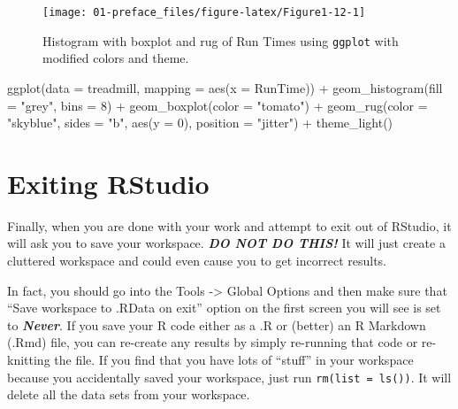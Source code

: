 \documentclass[
]{book}
\newenvironment{Shaded}{\begin{snugshade}}{\end{snugshade}}
\newcommand{\AttributeTok}[1]{\textcolor[rgb]{0.77,0.63,0.00}{#1}}
\newcommand{\DecValTok}[1]{\textcolor[rgb]{0.00,0.00,0.81}{#1}}
\newcommand{\FunctionTok}[1]{\textcolor[rgb]{0.00,0.00,0.00}{#1}}
\newcommand{\NormalTok}[1]{#1}
\newcommand{\SpecialCharTok}[1]{\textcolor[rgb]{0.00,0.00,0.00}{#1}}
\newcommand{\StringTok}[1]{\textcolor[rgb]{0.31,0.60,0.02}{#1}}
\begin{document}
\begin{figure}[ht!]

{\centering \texttt{[image: 01-preface\_files/figure-latex/Figure1-12-1]} 

}

\caption{Histogram with boxplot and rug of Run Times using \texttt{ggplot} with modified colors and theme.}\label{fig:Figure1-12}
\end{figure}

\begin{Shaded}
\begin{Highlighting}[]
\FunctionTok{ggplot}\NormalTok{(}\AttributeTok{data =}\NormalTok{ treadmill, }\AttributeTok{mapping =} \FunctionTok{aes}\NormalTok{(}\AttributeTok{x =}\NormalTok{ RunTime)) }\SpecialCharTok{+} 
  \FunctionTok{geom\_histogram}\NormalTok{(}\AttributeTok{fill =} \StringTok{"grey"}\NormalTok{, }\AttributeTok{bins =} \DecValTok{8}\NormalTok{) }\SpecialCharTok{+} 
  \FunctionTok{geom\_boxplot}\NormalTok{(}\AttributeTok{color =} \StringTok{"tomato"}\NormalTok{) }\SpecialCharTok{+} 
    \FunctionTok{geom\_rug}\NormalTok{(}\AttributeTok{color =} \StringTok{"skyblue"}\NormalTok{, }\AttributeTok{sides =} \StringTok{"b"}\NormalTok{, }\FunctionTok{aes}\NormalTok{(}\AttributeTok{y =} \DecValTok{0}\NormalTok{), }\AttributeTok{position =} \StringTok{"jitter"}\NormalTok{) }\SpecialCharTok{+} 
  \FunctionTok{theme\_light}\NormalTok{()}
\end{Highlighting}
\end{Shaded}

\newpage

\hypertarget{section1-6}{%
\section{Exiting RStudio}\label{section1-6}}

Finally, when you are done with your work and attempt to exit out of RStudio,
it will ask you to save your workspace. \textbf{\emph{DO NOT DO THIS!}} It will just
create a cluttered workspace and could even cause you to get incorrect results.

\indent In fact, you should go into the Tools -\textgreater{} Global Options and then make sure that
``Save workspace to .RData on exit'' option on the first screen you will see is
set to \textbf{\emph{Never}}. If you save your R code either as a .R or (better) an R
Markdown (.Rmd) file, you can re-create any results by simply
re-running that code or re-knitting the file. If you find that you have lots of
``stuff'' in your workspace because you accidentally saved your workspace, just
run \texttt{rm(list\ =\ ls())}. It will delete all the data sets from your workspace.
\end{document}
